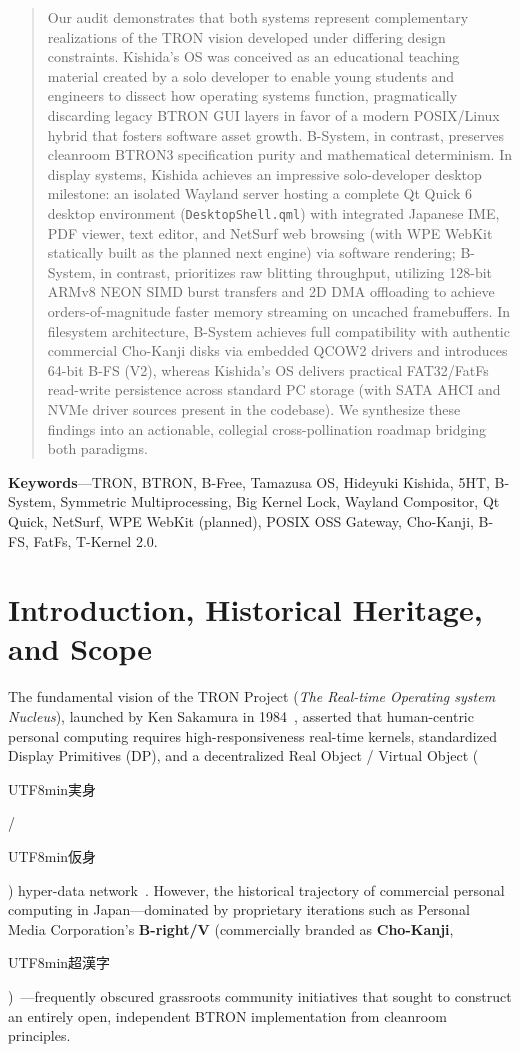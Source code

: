 \documentclass[10pt,journal,compsoc,twocolumn]{article}
\newcommand{\ja}[1]{\begin{CJK*}{UTF8}{min}#1\end{CJK*}}
\begin{document}
\begin{abstract}
Our audit demonstrates that both systems represent complementary realizations of the TRON vision developed under differing design constraints. Kishida's OS was conceived as an educational teaching material created by a solo developer to enable young students and engineers to dissect how operating systems function, pragmatically discarding legacy BTRON GUI layers in favor of a modern POSIX/Linux hybrid that fosters software asset growth. B-System, in contrast, preserves cleanroom BTRON3 specification purity and mathematical determinism. In display systems, Kishida achieves an impressive solo-developer desktop milestone: an isolated Wayland server hosting a complete Qt Quick 6 desktop environment (\texttt{DesktopShell.qml}) with integrated Japanese IME, PDF viewer, text editor, and NetSurf web browsing (with WPE WebKit statically built as the planned next engine) via software rendering; B-System, in contrast, prioritizes raw blitting throughput, utilizing 128-bit ARMv8 NEON SIMD burst transfers and 2D DMA offloading to achieve orders-of-magnitude faster memory streaming on uncached framebuffers. In filesystem architecture, B-System achieves full compatibility with authentic commercial Cho-Kanji disks via embedded QCOW2 drivers and introduces 64-bit B-FS (V2), whereas Kishida's OS delivers practical FAT32/FatFs read-write persistence across standard PC storage (with SATA AHCI and NVMe driver sources present in the codebase). We synthesize these findings into an actionable, collegial cross-pollination roadmap bridging both paradigms.
\end{abstract}

\noindent\textbf{\small Keywords}---TRON, BTRON, B-Free, Tamazusa OS, Hideyuki Kishida, 5HT, B-System, Symmetric Multiprocessing, Big Kernel Lock, Wayland Compositor, Qt Quick, NetSurf, WPE WebKit (planned), POSIX OSS Gateway, Cho-Kanji, B-FS, FatFs, T-Kernel 2.0.

\section{Introduction, Historical Heritage, and Scope}
\label{sec:intro}

The fundamental vision of the TRON Project (\emph{The Real-time Operating system Nucleus}), launched by Ken Sakamura in 1984~\cite{sakamura1984tron}, asserted that human-centric personal computing requires high-responsiveness real-time kernels, standardized Display Primitives (DP), and a decentralized Real Object / Virtual Object (\ja{実身}/\ja{仮身}) hyper-data network~\cite{btron3spec}. However, the historical trajectory of commercial personal computing in Japan—dominated by proprietary iterations such as Personal Media Corporation's \textbf{B-right/V} (commercially branded as \textbf{Cho-Kanji}, \ja{超漢字})~\cite{chokanji1999}—frequently obscured grassroots community initiatives that sought to construct an entirely open, independent BTRON implementation from cleanroom principles.
\end{document}
